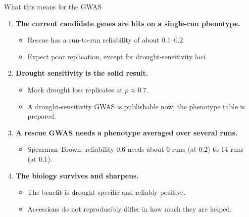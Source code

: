 \documentclass[aspectratio=169,11pt]{beamer}
\newcommand{\key}[1]{\textcolor{accent}{\textbf{#1}}}
\begin{document}
\begin{frame}{What this means for the GWAS}
  \begin{enumerate}
    \item \key{The current candidate genes are hits on a single-run phenotype.}
      \begin{itemize}
        \item Rescue has a run-to-run reliability of about 0.1--0.2.
        \item Expect poor replication, except for drought-sensitivity loci.
      \end{itemize}
    \item \key{Drought sensitivity is the solid result.}
      \begin{itemize}
        \item Mock drought loss replicates at $\rho\approx0.7$.
        \item A drought-sensitivity GWAS is publishable now; the phenotype table is
          prepared.
      \end{itemize}
    \item \key{A rescue GWAS needs a phenotype averaged over several runs.}
      \begin{itemize}
        \item Spearman--Brown: reliability 0.6 needs about 6 runs (at 0.2) to 14 runs
          (at 0.1).
      \end{itemize}
    \item \key{The biology survives and sharpens.}
      \begin{itemize}
        \item The benefit is drought-specific and reliably positive.
        \item Accessions do not reproducibly differ in how much they are helped.
      \end{itemize}
  \end{enumerate}
\end{frame}
\end{document}
